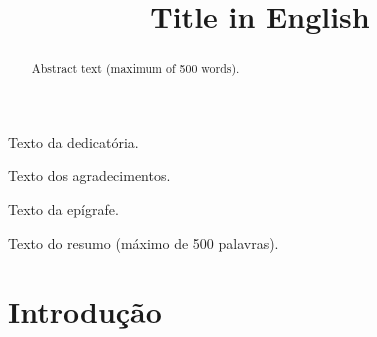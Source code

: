 \documentclass[openright]{normas-utf-tex} %
\title{Title in English} %
\begin{document}
\pdfstringdefDisableCommands{%
	\let\MakeUppercase\relax
}
\capa %
\folhaderosto %


%


\begin{dedicatoria}
Texto da dedicat\'oria.
\end{dedicatoria}

\begin{agradecimentos}
Texto dos agradecimentos.
\end{agradecimentos}

\begin{epigrafe}
Texto da ep\'igrafe.
\end{epigrafe}

\begin{resumo}
Texto do resumo (m\'aximo de 500 palavras).
\end{resumo}
\begin{abstract}
Abstract text (maximum of 500 words).
\end{abstract}

\listadefiguras %
\listadetabelas %
\listadesiglas %
\listadesimbolos %

\sumario %




%
%
%
%

\newcommand\extraPages{1}
\setcounter{savepage}{\value{page}+\extraPages}
\setcounter{page}{\value{savepage}}


\chapter{Introdução}
\label{chap:introducao}
\end{document}
